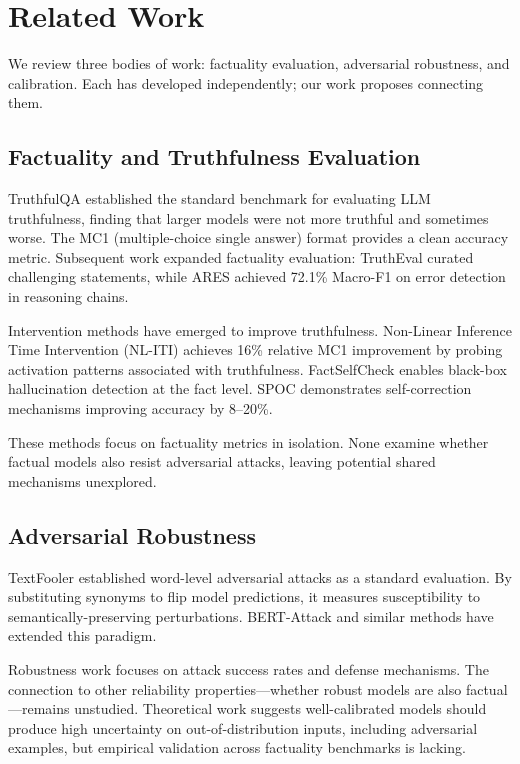 \section{Related Work}

We review three bodies of work: factuality evaluation, adversarial robustness, and calibration. Each has developed independently; our work proposes connecting them.

\subsection{Factuality and Truthfulness Evaluation}

TruthfulQA \cite{lin2022truthfulqa} established the standard benchmark for evaluating LLM truthfulness, finding that larger models were not more truthful and sometimes worse. The MC1 (multiple-choice single answer) format provides a clean accuracy metric. Subsequent work expanded factuality evaluation: TruthEval \cite{khatun2024trutheval} curated challenging statements, while ARES \cite{you2025ares} achieved 72.1\% Macro-F1 on error detection in reasoning chains.

Intervention methods have emerged to improve truthfulness. Non-Linear Inference Time Intervention (NL-ITI) \cite{hoscilowicz2024nliti} achieves 16\% relative MC1 improvement by probing activation patterns associated with truthfulness. FactSelfCheck \cite{sawczyn2025factselfcheck} enables black-box hallucination detection at the fact level. SPOC \cite{zhao2025spoc} demonstrates self-correction mechanisms improving accuracy by 8--20\%.

These methods focus on factuality metrics in isolation. None examine whether factual models also resist adversarial attacks, leaving potential shared mechanisms unexplored.

\subsection{Adversarial Robustness}

TextFooler \cite{jin2019textfooler} established word-level adversarial attacks as a standard evaluation. By substituting synonyms to flip model predictions, it measures susceptibility to semantically-preserving perturbations. BERT-Attack and similar methods have extended this paradigm.

Robustness work focuses on attack success rates and defense mechanisms. The connection to other reliability properties---whether robust models are also factual---remains unstudied. Theoretical work suggests well-calibrated models should produce high uncertainty on out-of-distribution inputs, including adversarial examples, but empirical validation across factuality benchmarks is lacking.

